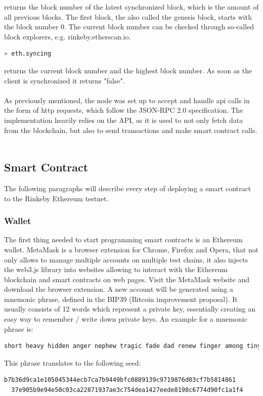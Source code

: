 returns the block number of the latest synchronized block, which is the amount of all previous blocks. The first block, the also called the genesis block, starts with the block number 0. The current block number can be checked through so-called block explorers, e.g. {rinkeby.etherscan.io}.
\\
\begin{lstlisting}[language=bash, numbers=none]
  > eth.syncing
\end{lstlisting}
returns the current block number and the highest block number. As soon as the client is synchronized it returns "false"\cite{javascript-0.20}.
\\\\
As previously mentioned, the node was set up to accept and handle api calls in the form of http requests, which follow the JSON-RPC 2.0 specification\cite{json-rpc-spec}. The implementation heavily relies on the API, as it is used to not only fetch data from the blockchain, but also to send transactions and make smart contract calls\cite{json-rpc}\cite{management-apis}.
\\\\
\subsection{Smart Contract}
The following paragraphs will describe every step of deploying a smart contract to the Rinkeby Ethereum testnet.
\\ 
\subsubsection{Wallet}
The first thing needed to start programming smart contracts is an Ethereum wallet. MetaMask is a browser extension for Chrome, Firefox and Opera, that not only allows to manage multiple accounts on multiple test chains, it also injects the web3.js library into websites allowing to interact with the Ethereum blockchain and smart contracts on web pages.
Visit the MetaMask\cite{metamask} website and download the browser extension. A new account will be generated using a mnemonic phrase, defined in the BIP39 (Bitcoin improvement proposal)\cite{bip39}. It usually consists of 12 words which represent a private key, essentially creating an easy way to remember / write down private keys. An example for a mnemonic phrase is:
\begin{lstlisting}[language=bash, numbers=none]
  short heavy hidden anger nephew tragic fade dad renew finger among tiny
\end{lstlisting}
This phrase translates to the following seed:
\begin{lstlisting}[language=bash, numbers=none]
  b7b36d9ca1e105045344ecb7ca7b9449bfc0889139c9719876d03cf7b5814861
  37e905b9e94e50c03ca22871937ae3c754dea1427eede8198c6774d90fc1a1f4
\end{lstlisting}

